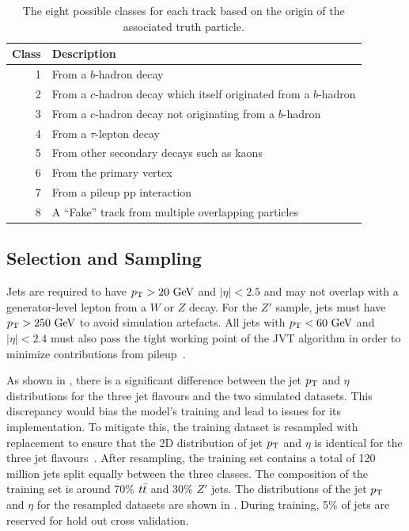 \begin{table}
    \centering
    \begin{tabular}{rl}
        \toprule
        Class & Description                                                       \\
        \midrule
        1     & From a $b$-hadron decay                                           \\
        2     & From a $c$-hadron decay which itself originated from a $b$-hadron \\
        3     & From a $c$-hadron decay not originating from a $b$-hadron         \\
        4     & From a $\tau$-lepton decay                                        \\
        5     & From other secondary decays such as kaons                         \\
        6     & From the primary vertex                                           \\
        7     & From a pileup \Gls{pp} interaction                                \\
        8     & A ``Fake'' track from multiple overlapping particles              \\
        \bottomrule
    \end{tabular}
    \caption{The eight possible classes for each track based on the origin of the associated truth particle.}
    \label{tab:track_labels}
\end{table}

\subsection{Selection and Sampling}

Jets are required to have $\pt > 20~\GeV$ and $|\eta| < 2.5$ and may not overlap with a generator-level lepton from a $W$ or $Z$ decay.
For the $Z'$ sample, jets must have $\pt > 250~\GeV$ to avoid simulation artefacts.
All jets with $\pt < 60~\GeV$ and $|\eta| < 2.4$ must also pass the tight working point of the JVT algorithm in order to minimize contributions from pileup~\cite{JVT}.

As shown in , there is a significant difference between the jet $p_\mathrm{T}$ and $\eta$ distributions for the three jet flavours and the two simulated datasets.
This discrepancy would bias the model's training and lead to issues for its implementation.
To mitigate this, the training dataset is resampled with replacement to ensure that the 2D distribution of jet $p_\mathrm{T}$ and $\eta$ is identical for the three jet flavours~\cite{AlexThesis}.
After resampling, the training set contains a total of 120 million jets split equally between the three classes.
The composition of the training set is around 70\% $t\bar{t}$ and 30\% $Z'$ jets.
The distributions of the jet $p_\mathrm{T}$ and $\eta$ for the resampled datasets are shown in .
During training, 5\% of jets are reserved for hold out cross validation.

